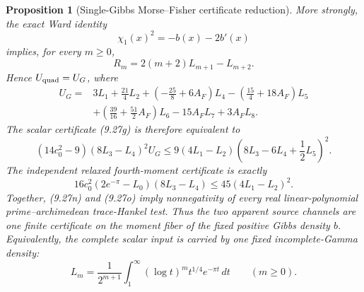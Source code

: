 \documentclass[11pt]{article}
\newtheorem{proposition}[theorem]{Proposition}
\begin{document}
\begin{proposition}[Single-Gibbs Morse--Fisher certificate reduction]
More strongly, the exact Ward identity
\[
 \chi_1(x)^2=-b(x)-2b'(x)                       \tag{9.27k}
\]
implies, for every $m\ge0$,
\[
 R_m=2(m+2)L_{m+1}-L_{m+2}.                    \tag{9.27l}
\]
Hence $U_{\rm quad}=U_G$, where
\[
\begin{aligned}
 U_G={}&3L_1+\frac{21}{4}L_2+
 \left(-\frac{25}{8}+6A_F\right)L_4
 -\left(\frac{15}{4}+18A_F\right)L_5\\
 &+\left(\frac{39}{16}+\frac{51}{2}A_F\right)L_6
 -15A_FL_7+3A_FL_8.
\end{aligned}                                  \tag{9.27m}
\]
The scalar certificate \textup{(9.27g)} is therefore equivalent to
\[
 (14c_0^2-9)(8L_3-L_4)^2U_G
 \le9(4L_1-L_2)
 \left(8L_3-6L_4+\frac12L_5\right)^2.          \tag{9.27n}
\]
The independent relaxed fourth-moment certificate is exactly
\[
 16c_0^2(2e^{-\pi}-L_0)(8L_3-L_4)
 \le45(4L_1-L_2)^2.                            \tag{9.27o}
\]
Together, \textup{(9.27n)} and \textup{(9.27o)} imply nonnegativity of every real
linear-polynomial prime--archimedean trace-Hankel test.  Thus the two apparent source channels
are one finite certificate on the moment fiber of the fixed positive Gibbs density $b$.
Equivalently, the complete scalar input is carried by one fixed incomplete-Gamma density:
\[
 L_m=\frac1{2^{m+1}}
 \int_1^\infty(\log t)^m t^{1/4}e^{-\pi t}\,dt
 \qquad(m\ge0).                                \tag{9.27p}
\]
\end{proposition}
\end{document}
